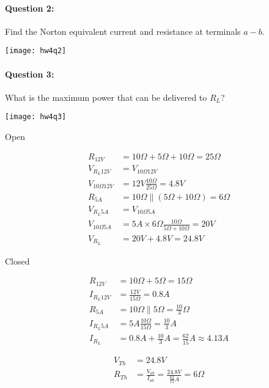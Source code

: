 \documentclass[12pt,letterpaper,titlepage]{article}
\begin{document}
\begin{raggedright}
\paragraph{Question 2: }

Find the Norton equivalent current and resistance at terminals $a-b$.

\begin{center}
\texttt{[image: hw4q2]}
\end{center}


\clearpage

\paragraph{Question 3: }

What is the maximum power that can be delivered to $R_L$?

\begin{center}
\texttt{[image: hw4q3]}
\end{center}

\begin{paracol}{2}
\begin{center}Open\end{center}
\begin{align*}
    R_{12V}    &= 10\Omega + 5\Omega + 10\Omega = 25\Omega
\\  V_{R_L12V} &= V_{10\Omega12V}
\\  V_{10\Omega12V} &= 12V \frac{10\Omega}{25\Omega} = 4.8V
\\  R_{5A} &= 10\Omega\parallel(5\Omega + 10\Omega) = 6\Omega
\\  V_{R_L5A} &= V_{10\Omega5A}
\\  V_{10\Omega5A} &= 5A \times 6\Omega \frac{10\Omega}{5\Omega+10\Omega} = 20V
\\  V_{R_L} &= 20V + 4.8V = 24.8V
\end{align*}
\switchcolumn
\begin{center}Closed\end{center}
\begin{align*}
    R_{12V} &= 10\Omega + 5\Omega = 15\Omega
\\  I_{R_L12V} &= \frac{12V}{15\Omega} = 0.8A
\\  R_{5A} &= 10\Omega\parallel 5\Omega = \frac{10}{3}\Omega
\\  I_{R_L5A} &= 5A \frac{10\Omega}{15\Omega} = \frac{10}{3}A
\\  I_{R_L} &= 0.8A + \frac{10}{3}A = \frac{62}{15}A \approx 4.13A
\end{align*}
\end{paracol}
\begin{align*}
    V_{Th} &= 24.8V
\\  R_{Th} &= \frac{V_{ab}}{I_{ab}} = \frac{24.8V}{\frac{62}{15}A} = 6\Omega
\end{align*}


\end{raggedright}
\end{document}
